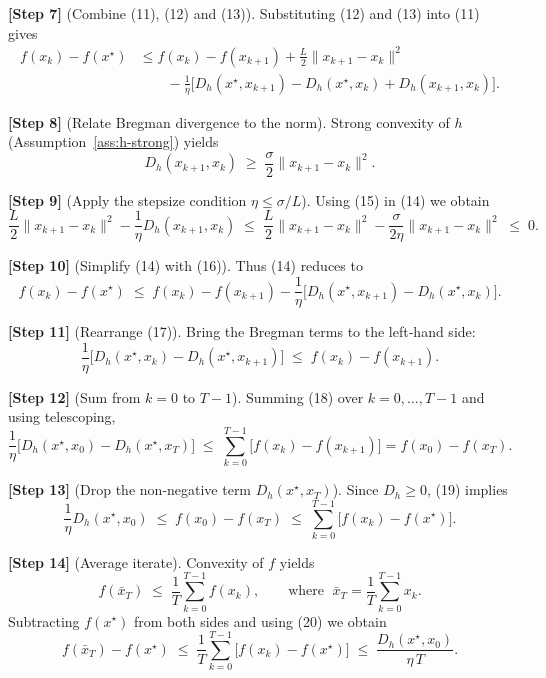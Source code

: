 \documentclass{article}
\begin{document}
\noindent\textbf{[Step 7]} (Combine (11), (12) and (13)).  
Substituting (12) and (13) into (11) gives
\[
\begin{aligned}
f(x_{k})-f(x^{\star})
&\le f(x_{k})-f(x_{k+1})+\frac{L}{2}\|x_{k+1}-x_{k}\|^{2} \\
&\qquad -\frac{1}{\eta}\Big[D_{h}(x^{\star},x_{k+1})-D_{h}(x^{\star},x_{k})+D_{h}(x_{k+1},x_{k})\Big].
\end{aligned}
\tag{14}
\]

\noindent\textbf{[Step 8]} (Relate Bregman divergence to the norm).  
Strong convexity of $h$ (Assumption~\ref{ass:h-strong}) yields
\[
D_{h}(x_{k+1},x_{k})\;\ge\;\frac{\sigma}{2}\|x_{k+1}-x_{k}\|^{2}. \tag{15}
\]

\noindent\textbf{[Step 9]} (Apply the stepsize condition $\eta\le\sigma/L$).  
Using (15) in (14) we obtain
\[
\frac{L}{2}\|x_{k+1}-x_{k}\|^{2}
-\frac{1}{\eta}D_{h}(x_{k+1},x_{k})
\;\le\;
\frac{L}{2}\|x_{k+1}-x_{k}\|^{2}
-\frac{\sigma}{2\eta}\|x_{k+1}-x_{k}\|^{2}
\;\le\;0.
\tag{16}
\]

\noindent\textbf{[Step 10]} (Simplify (14) with (16)).  
Thus (14) reduces to
\[
f(x_{k})-f(x^{\star})\;\le\; f(x_{k})-f(x_{k+1})
-\frac{1}{\eta}\big[D_{h}(x^{\star},x_{k+1})-D_{h}(x^{\star},x_{k})\big].
\tag{17}
\]

\noindent\textbf{[Step 11]} (Rearrange (17)).  
Bring the Bregman terms to the left‑hand side:
\[
\frac{1}{\eta}\big[D_{h}(x^{\star},x_{k})-D_{h}(x^{\star},x_{k+1})\big]
\;\le\; f(x_{k})-f(x_{k+1}).
\tag{18}
\]

\noindent\textbf{[Step 12]} (Sum from $k=0$ to $T-1$).  
Summing (18) over $k=0,\dots,T-1$ and using telescoping,
\[
\frac{1}{\eta}\Big[D_{h}(x^{\star},x_{0})-D_{h}(x^{\star},x_{T})\Big]
\;\le\; \sum_{k=0}^{T-1}\big[f(x_{k})-f(x_{k+1})\big]
      = f(x_{0})-f(x_{T}). \tag{19}
\]

\noindent\textbf{[Step 13]} (Drop the non‑negative term $D_{h}(x^{\star},x_{T})$).  
Since $D_{h}\ge0$, (19) implies
\[
\frac{1}{\eta}D_{h}(x^{\star},x_{0})\;\le\; f(x_{0})-f(x_{T})
\;\le\; \sum_{k=0}^{T-1}\big[f(x_{k})-f(x^{\star})\big].
\tag{20}
\]

\noindent\textbf{[Step 14]} (Average iterate).  
Convexity of $f$ yields
\[
f(\bar x_{T})\;\le\;\frac{1}{T}\sum_{k=0}^{T-1}f(x_{k}),
\qquad\text{where }\;\bar x_{T}=\frac{1}{T}\sum_{k=0}^{T-1}x_{k}.
\]
Subtracting $f(x^{\star})$ from both sides and using (20) we obtain
\[
f(\bar x_{T})-f(x^{\star})
\;\le\;\frac{1}{T}\sum_{k=0}^{T-1}\big[f(x_{k})-f(x^{\star})\big]
\;\le\;\frac{D_{h}(x^{\star},x_{0})}{\eta\,T}.
\tag{21}
\]
\end{document}
